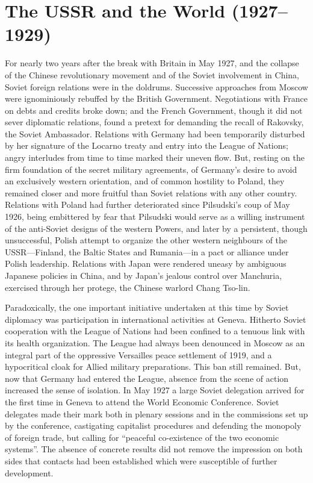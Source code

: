 \chapter{The USSR and the World (1927--1929)}

For nearly two years after the break with Britain in May 1927, and the collapse of the Chinese revolutionary movement and of the Soviet involvement in China, Soviet foreign relations were in the doldrums. Successive approaches from Moscow were ignominiously rebuffed by the British Government. Negotiations with France on debts and credits broke down; and the French Government, though it did not sever diplomatic relations, found a pretext for demanding the recall of Rakovsky, the Soviet Ambassador. Relations with Germany had been temporarily disturbed by her signature of the Locarno treaty and entry into the League of Nations; angry interludes from time to time marked their uneven flow. But, resting on the firm foundation of the secret military agreements, of Germany's desire to avoid an exclusively western orientation, and of common hostility to Poland, they remained closer and more fruitful than Soviet relations with any other country. Relations with Poland had further deteriorated since Pilsudski's coup of May 1926, being embittered by fear that Pilsudski would serve as a willing instrument of the anti-Soviet designs of the western Powers, and later by a persistent, though unsuccessful, Polish attempt to organize the other western neighbours of the USSR---Finland, the Baltic States and Rumania---in a pact or alliance under Polish leadership. Relations with Japan were rendered uneasy by ambiguous Japanese policies in China, and by Japan's jealous control over Manchuria, exercised through her protege, the Chinese warlord Chang Tso-lin. 

Paradoxically, the one important initiative undertaken at this time by Soviet diplomacy was participation in international activities at Geneva. Hitherto Soviet cooperation with the League of Nations had been confined to a tenuous link with its health organization. The League had always been denounced in Moscow as an integral part of the oppressive Versailles peace settlement of 1919, and a hypocritical cloak for Allied military preparations. This ban still remained. But, now that Germany had entered the League, absence from the scene of action increased the sense of isolation. In May 1927 a large Soviet delegation arrived for the first time in Geneva to attend the World Economic Conference. Soviet delegates made their mark both in plenary sessions and in the commissions set up by the conference, castigating capitalist procedures and defending the monopoly of foreign trade, but calling for ``peaceful co-existence of the two economic systems''. The absence of concrete results did not remove the impression on both sides that contacts had been established which were susceptible of further development. 

